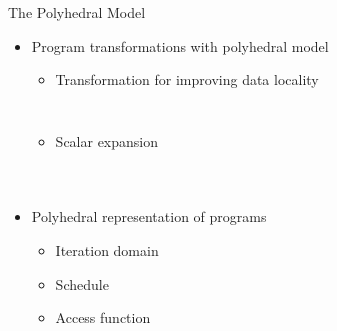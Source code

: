 \documentclass{beamer}
\begin{document}
\begin{frame}[allowframebreaks]{The Polyhedral Model}
\begin{itemize}
\item Program transformations with polyhedral model
	\begin{itemize}
	\item Transformation for improving data locality
	\begin{columns}[t]
		\begin{block}{ }
	{\tiny}
		\end{block}
		\column{.5\textwidth}
		\begin{block}{ }
	{\tiny}
		\end{block}
	\end{columns}

	\item Scalar expansion
	\begin{columns}[t]
		\begin{block}{ }
		{\tiny}
		\end{block}
		\column{.5\textwidth}
		\begin{block}{ }
		{\tiny}
		\end{block}
	\end{columns}
	\begin{columns}
	\column{0.5\textwidth}
		\begin{block}{ }
		{\tiny}
		\end{block}
		\end{columns}
	\end{itemize}

\item Polyhedral representation of programs
	\begin{itemize}
	\item Iteration domain
	\item Schedule
	\item Access function
	\end{itemize}
	
\end{itemize}
\end{frame}
\end{document}
